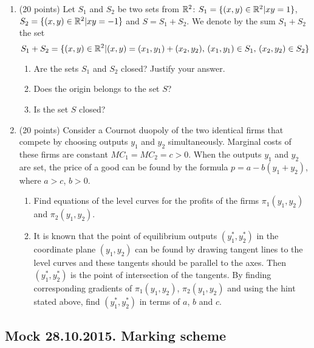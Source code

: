 \begin{enumerate}[resume]


\item (20 points) Let $S_1$ and $S_2$ be two sets from $\mathbb{R}^2$: $S_1=\{(x,y) \in \mathbb{R}^2 | xy=1 \}$, $S_2=\{(x,y) \in \mathbb{R}^2 | xy=-1 \}$ and $S=S_1+S_2$. We denote by the sum $S_1+S_2$ the set
\[
S_1+S_2=\{ (x,y) \in \mathbb{R}^2 | (x,y)=(x_1,y_1)+(x_2,y_2), \, (x_1,y_1) \in S_1, \, (x_2,y_2) \in S_2 \}
\]
\begin{enumerate}
\item Are the sets $S_1$ and $S_2$ closed? Justify your answer.
\item Does the origin belongs to the set $S$? %
\item Is the set $S$ closed? %
\end{enumerate}
\item (20 points) Consider a Cournot duopoly of the two identical firms that compete by choosing outputs $y_1$  and $y_2$  simultaneously. Marginal costs of these firms are constant $MC_1=MC_2=c>0$. When the outputs $y_1$  and $y_2$ are set, the price of a good can be found by the formula  $p=a-b(y_1+y_2)$, where  $a>c$, $b>0$.
\begin{enumerate}
\item Find equations of the level curves for the profits of the firms $\pi_1(y_1, y_2)$ and  $\pi_2(y_1, y_2)$.
\item It is known that the point of equilibrium outputs $(y_1^*, y_2^*)$  in the coordinate plane $(y_1, y_2)$ can be found by drawing tangent lines to the level curves and these tangents should be parallel to the axes.
Then $(y_1^*, y_2^*)$ is the point of intersection of the tangents.
By finding corresponding gradients of $\pi_1(y_1, y_2)$,  $\pi_2(y_1, y_2)$ and using the hint stated above, find    $(y_1^*, y_2^*)$ in terms of $a$, $b$ and $c$.
\end{enumerate}

\end{enumerate}


\subsection{Mock 28.10.2015. Marking scheme}

